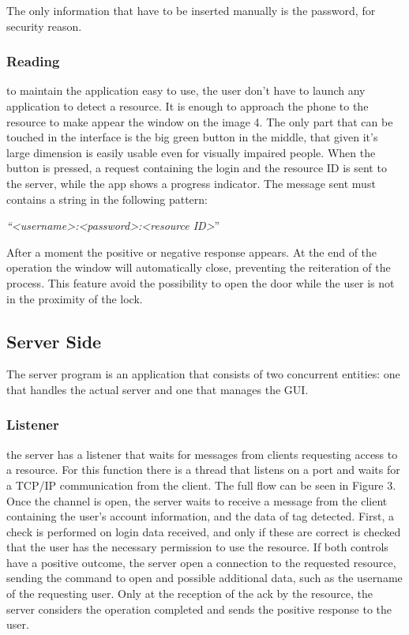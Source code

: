 \documentclass[conference]{IEEEtran}
\begin{document}
 The only information that have to be inserted manually is the password, for security reason.

\subsubsection{Reading}

to maintain the application easy to use, the user don’t have to launch any application to detect a resource. It is enough to approach the phone to the resource to make appear the window on the image 4. The only part that can be touched in the interface is the big green button in the middle, that given it’s large dimension is easily usable even for visually impaired people. When the button is pressed, a request containing the login and the resource ID is sent to the server, while the app shows a progress indicator. The message sent must contains a string in the following pattern:
\begin{center}
\textit{``\textless username\textgreater :\textless password\textgreater :\textless resource ID\textgreater}''
\end{center}
 After a moment the positive or negative response appears. At the end of the operation the window will automatically close, preventing the reiteration of the process. This feature avoid the possibility to open the door while the user is not in the proximity of the lock.

\subsection{Server Side}

The server program is an application that consists of two concurrent entities: one that handles the actual server and one that manages the GUI.

\subsubsection{Listener}

the server has a listener that waits for messages from clients requesting access to a resource. For this function there is a thread that listens on a port and waits for a TCP/IP communication from the client. The full flow can be seen in Figure 3.
Once the channel is open, the server waits to receive a message from the client containing the user's account information, and the data of tag detected. First, a check is performed on login data received, and only if these are correct is checked that the user has the necessary permission to use the resource. If both controls have a positive outcome, the server open a connection to the requested resource, sending the command to open and possible additional data, such as the username of the requesting user. Only at the reception of the ack by the resource, the server considers the operation completed and sends the positive response to the user.
\end{document}
